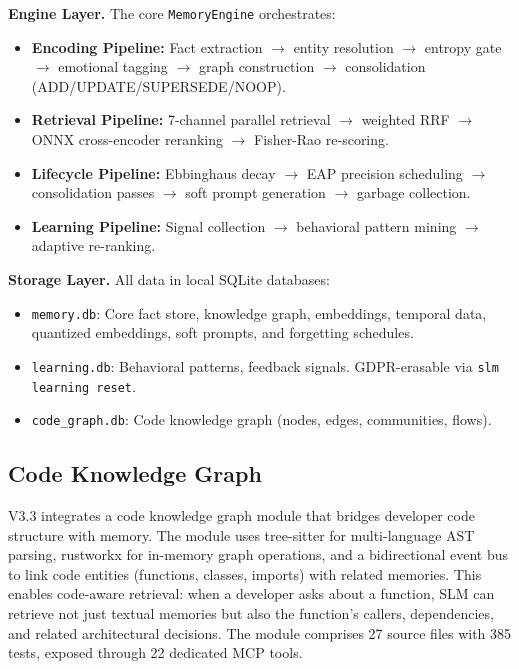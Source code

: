\textbf{Engine Layer.} The core \texttt{MemoryEngine} orchestrates:
\begin{itemize}[topsep=2pt, itemsep=1pt]
  \item \textbf{Encoding Pipeline:} Fact extraction $\to$ entity resolution $\to$ entropy gate $\to$ emotional tagging $\to$ graph construction $\to$ consolidation (ADD/UPDATE/SUPERSEDE/NOOP).
  \item \textbf{Retrieval Pipeline:} 7-channel parallel retrieval $\to$ weighted RRF $\to$ ONNX cross-encoder reranking $\to$ Fisher-Rao re-scoring.
  \item \textbf{Lifecycle Pipeline:} Ebbinghaus decay $\to$ EAP precision scheduling $\to$ consolidation passes $\to$ soft prompt generation $\to$ garbage collection.
  \item \textbf{Learning Pipeline:} Signal collection $\to$ behavioral pattern mining $\to$ adaptive re-ranking.
\end{itemize}

\textbf{Storage Layer.} All data in local SQLite databases:
\begin{itemize}[topsep=2pt, itemsep=1pt]
  \item \texttt{memory.db}: Core fact store, knowledge graph, embeddings, temporal data, quantized embeddings, soft prompts, and forgetting schedules.
  \item \texttt{learning.db}: Behavioral patterns, feedback signals. GDPR-erasable via \texttt{slm learning reset}.
  \item \texttt{code\_graph.db}: Code knowledge graph (nodes, edges, communities, flows).
\end{itemize}

\subsection{Code Knowledge Graph}

V3.3 integrates a code knowledge graph module that bridges developer code structure with memory. The module uses tree-sitter for multi-language AST parsing, rustworkx for in-memory graph operations, and a bidirectional event bus to link code entities (functions, classes, imports) with related memories. This enables code-aware retrieval: when a developer asks about a function, SLM can retrieve not just textual memories but also the function's callers, dependencies, and related architectural decisions. The module comprises 27 source files with 385 tests, exposed through 22 dedicated MCP tools.

